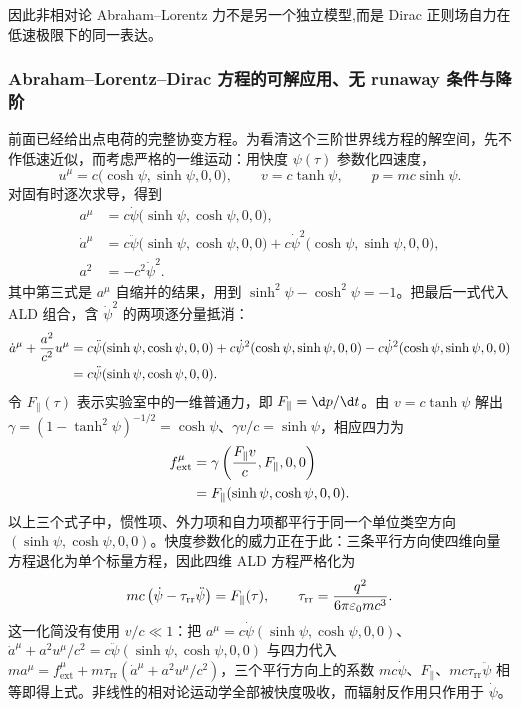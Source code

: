 因此非相对论 Abraham--Lorentz 力不是另一个独立模型,而是 Dirac 正则场自力在低速极限下的同一表达。

\subsubsection{Abraham--Lorentz--Dirac 方程的可解应用、无 runaway 条件与降阶}

前面已经给出点电荷的完整协变方程。为看清这个三阶世界线方程的解空间，先不作低速近似，而考虑严格的一维运动：用快度 $\psi(\tau)$ 参数化四速度，
\begin{equation*}
 u^\mu=c\bigl(\cosh\psi,\sinh\psi,0,0\bigr),
 \qquad
 v=c\tanh\psi,
 \qquad
 p=mc\sinh\psi.
\end{equation*}
对固有时逐次求导，得到
\begin{align*}
 a^\mu
 &=c\dot\psi\bigl(\sinh\psi,\cosh\psi,0,0\bigr),\\
 \dot a^\mu
 &=c\ddot\psi\bigl(\sinh\psi,\cosh\psi,0,0\bigr)
 +c\dot\psi^2\bigl(\cosh\psi,\sinh\psi,0,0\bigr),\\
 a^2&=-c^2\dot\psi^2.
\end{align*}
其中第三式是 $a^\mu$ 自缩并的结果，用到 $\sinh^2\psi-\cosh^2\psi=-1$。把最后一式代入 ALD 组合，含 $\dot\psi^2$ 的两项逐分量抵消：
\begin{align*}
 \dot a^\mu+{a^2\over c^2}u^\mu
 &={}c\ddot\psi(\sinh\psi,\cosh\psi,0,0)
 +c\dot\psi^2(\cosh\psi,\sinh\psi,0,0)
 -c\dot\psi^2(\cosh\psi,\sinh\psi,0,0)\\
 &=c\ddot\psi(\sinh\psi,\cosh\psi,0,0).
\end{align*}
令 $F_\parallel(\tau)$ 表示实验室中的一维普通力，即 $F_\parallel=\d p/\d t$。由 $v=c\tanh\psi$ 解出 $\gamma=(1-\tanh^2\psi)^{-1/2}=\cosh\psi$、$\gamma v/c=\sinh\psi$，相应四力为
\begin{align*}
 f_{\mathrm{ext}}^\mu
 &=\gamma\left({F_\parallel v\over c},F_\parallel,0,0\right)\\
 &=F_\parallel(\sinh\psi,\cosh\psi,0,0).
\end{align*}
以上三个式子中，惯性项、外力项和自力项都平行于同一个单位类空方向 $(\sinh\psi,\cosh\psi,0,0)$。快度参数化的威力正在于此：三条平行方向使四维向量方程退化为单个标量方程，因此四维 ALD 方程严格化为
\begin{equation*}
 mc\left(\dot\psi-\tau_{\mathrm{rr}}\ddot\psi\right)
 =F_\parallel(\tau),
 \qquad
 \tau_{\mathrm{rr}}={q^2\over6\pi\varepsilon_0mc^3}.
\end{equation*}
这一化简没有使用 $v/c\ll1$：把 $a^\mu=c\dot\psi(\sinh\psi,\cosh\psi,0,0)$、$\dot a^\mu+a^2u^\mu/c^2=c\ddot\psi(\sinh\psi,\cosh\psi,0,0)$ 与四力代入 $ma^\mu=f_{\mathrm{ext}}^\mu+m\tau_{\mathrm{rr}}(\dot a^\mu+a^2u^\mu/c^2)$，三个平行方向上的系数 $mc\dot\psi$、$F_\parallel$、$mc\tau_{\mathrm{rr}}\ddot\psi$ 相等即得上式。非线性的相对论运动学全部被快度吸收，而辐射反作用只作用于 $\dot\psi$。

